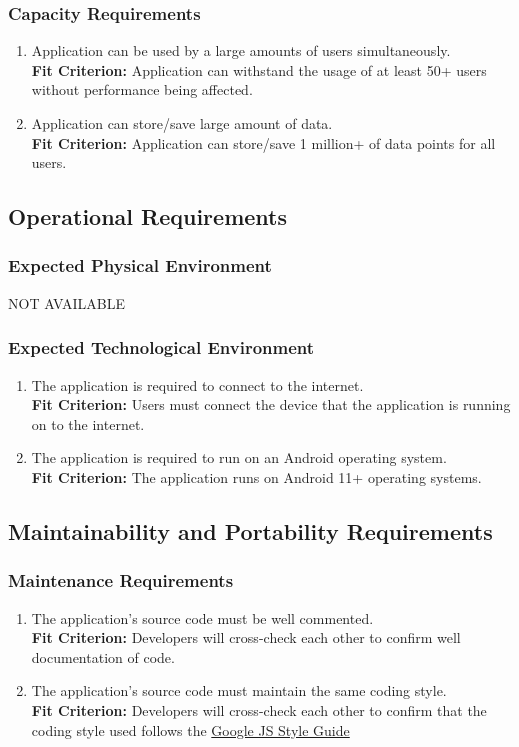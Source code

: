 \documentclass[12pt,letterpaper]{article}
\begin{document}
\subsubsection{Capacity Requirements}
\begin{enumerate}[resume*] 
	\item Application can be used by a large amounts of users simultaneously.\\
	{\textbf{Fit Criterion:} Application can withstand the usage of at least 50+ users without performance being affected. }
	\item Application can store/save large amount of data.\\
	{\textbf{Fit Criterion:} Application can store/save 1 million+ of data points for all users. }
\end{enumerate}

\subsection{Operational Requirements}
\subsubsection{Expected Physical Environment}
NOT AVAILABLE
\subsubsection{Expected Technological Environment}
\begin{enumerate}[{OE}1.] 
	\item The application is required to connect to the internet.\\
	{\textbf{Fit Criterion:} Users must connect the device that the application is running on to the internet.}
	\item The application is required to run on an Android operating system.\\
	{\textbf{Fit Criterion:} The application runs on Android 11+ operating systems.}
\end{enumerate}
\subsection{Maintainability and Portability Requirements}
\subsubsection{Maintenance Requirements}
\begin{enumerate}[{MP}1.] 
	\item The application's source code must be well commented. \\
	{\textbf{Fit Criterion:} Developers will cross-check each other to confirm well documentation of code. }
	\item The application's source code must maintain the same coding style. \\
	{\textbf{Fit Criterion:} Developers will cross-check each other to confirm that the coding style used follows the \href{https://google.github.io/styleguide/jsguide.html}{\color{blue}Google JS Style Guide}}
\end{enumerate}
\end{document}

